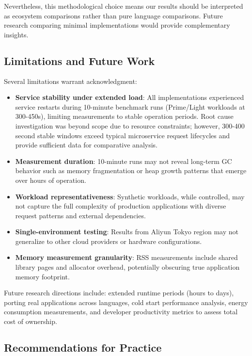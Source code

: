 \documentclass{article}
\begin{document}
Nevertheless, this methodological choice means our results should be interpreted as ecosystem comparisons rather than pure language comparisons. Future research comparing minimal implementations would provide complementary insights.

\subsection{Limitations and Future Work}

Several limitations warrant acknowledgment:

\begin{itemize}
    \item \textbf{Service stability under extended load}: All implementations experienced service restarts during 10-minute benchmark runs (Prime/Light workloads at 300-450s), limiting measurements to stable operation periods. Root cause investigation was beyond scope due to resource constraints; however, 300-400 second stable windows exceed typical microservice request lifecycles and provide sufficient data for comparative analysis.

    \item \textbf{Measurement duration}: 10-minute runs may not reveal long-term GC behavior such as memory fragmentation or heap growth patterns that emerge over hours of operation.

    \item \textbf{Workload representativeness}: Synthetic workloads, while controlled, may not capture the full complexity of production applications with diverse request patterns and external dependencies.

    \item \textbf{Single-environment testing}: Results from Aliyun Tokyo region may not generalize to other cloud providers or hardware configurations.

    \item \textbf{Memory measurement granularity}: RSS measurements include shared library pages and allocator overhead, potentially obscuring true application memory footprint.
\end{itemize}

Future research directions include: extended runtime periods (hours to days), porting real applications across languages, cold start performance analysis, energy consumption measurements, and developer productivity metrics to assess total cost of ownership.

\subsection{Recommendations for Practice}
\end{document}
